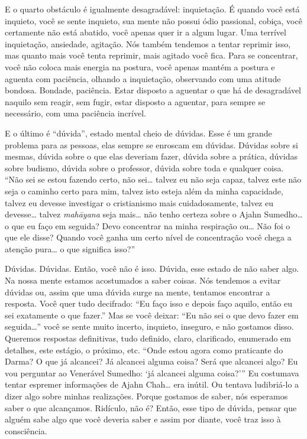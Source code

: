 E o quarto obstáculo é igualmente desagradável: inquietação. É
quando você está inquieto, você se sente inquieto, sua mente não possui
ódio passional, cobiça, você certamente não está abatido, você apenas
quer ir a algum lugar. Uma terrível inquietação, ansiedade, agitação.
Nós também tendemos a tentar reprimir isso, mas quanto mais você tenta
reprimir, mais agitado você fica. Para se concentrar, você não coloca
mais energia na postura, você apenas mantém a postura e aguenta com
paciência, olhando a inquietação, observando com uma atitude bondosa.
Bondade, paciência. Estar disposto a aguentar o que há de desagradável
naquilo sem reagir, sem fugir, estar disposto a aguentar, para sempre
se necessário, com uma paciência incrível.

E o último é “dúvida”, estado mental cheio de dúvidas. Esse é um
grande problema para as pessoas, elas sempre se enroscam em dúvidas.
Dúvidas sobre si mesmas, dúvida sobre o que elas deveriam fazer, dúvida
sobre a prática, dúvidas sobre budismo, dúvida sobre o professor,
dúvida sobre toda e qualquer coisa. “Não sei se estou fazendo certo,
não sei… talvez eu não seja capaz, talvez este não seja o caminho certo
para mim, talvez isto esteja além da minha capacidade, talvez eu
devesse investigar o cristianismo mais cuidadosamente, talvez eu
devesse… talvez \textit{mahāyana} seja mais… não tenho certeza sobre
o Ajahn Sumedho… o que eu faço em seguida? Devo concentrar na minha
respiração ou… Não foi o que ele disse? Quando você ganha um certo
nível de concentração você chega a atenção pura… o que significa isso?”

Dúvidas. Dúvidas. Então, você não é isso. Dúvida, esse estado de não
saber algo. Na nossa mente estamos acostumados a saber coisas. Nós
tendemos a evitar dúvidas ou, assim que uma dúvida surge na mente,
tentamos encontrar a resposta. Você quer tudo decifrado: “Eu faço isso
e depois faço aquilo, então eu sei exatamente o que fazer.” Mas se você
deixar: “Eu não sei o que devo fazer em seguida…” você se sente muito
incerto, inquieto, inseguro, e não gostamos disso. Queremos respostas
definitivas, tudo definido, claro, clarificado, enumerado em detalhes,
este estágio, o próximo, etc. “Onde estou agora como praticante do
Darma? O que já alcancei? Já alcancei alguma coisa? Será que alcancei
algo? Eu vou perguntar ao Venerável Sumedho: ‘já alcancei alguma
coisa?’” Eu costumava tentar espremer informações de Ajahn Chah… era
inútil. Ou tentava ludibriá-lo a dizer algo sobre minhas realizações.
Porque gostamos de saber, nós esperamos saber o que alcançamos.
Ridículo, não é? Então, esse tipo de dúvida, pensar que alguém sabe
algo que você deveria saber e assim por diante, você traz isso à
consciência. 

